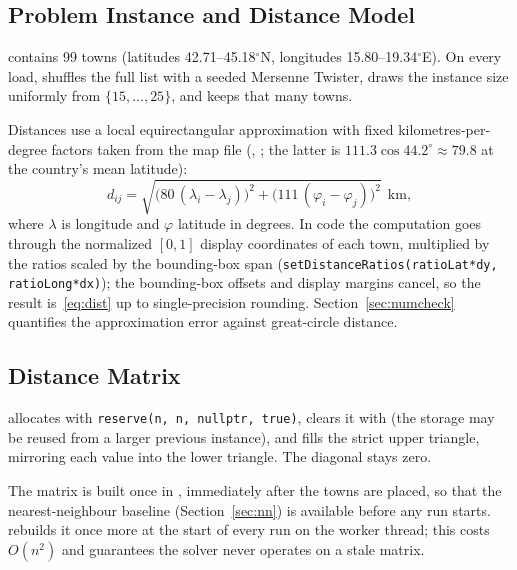 \documentclass[11pt,a4paper]{article}
\begin{document}
\subsection{Problem Instance and Distance Model}
 contains 99 towns (latitudes 42.71--45.18$^\circ$N, longitudes
15.80--19.34$^\circ$E). On every load,  shuffles the full list with a seeded
Mersenne Twister, draws the instance size uniformly from $\{15,\dots,25\}$, and keeps that many towns.

Distances use a local equirectangular approximation with fixed kilometres-per-degree factors taken from
the map file (, ; the latter is $111.3\cos 44.2^\circ\approx 79.8$
at the country's mean latitude):
\begin{equation}
d_{ij}=\sqrt{\bigl(80\,(\lambda_i-\lambda_j)\bigr)^2+\bigl(111\,(\varphi_i-\varphi_j)\bigr)^2}\ \ \text{km},
\label{eq:dist}
\end{equation}
where $\lambda$ is longitude and $\varphi$ latitude in degrees. In code the computation goes through the
normalized $[0,1]$ display coordinates of each town, multiplied by the ratios scaled by the bounding-box
span (\texttt{setDistanceRatios(ratioLat*dy, ratioLong*dx)}); the bounding-box offsets and display margins
cancel, so the result is~\eqref{eq:dist} up to single-precision rounding. Section~\ref{sec:numcheck} quantifies the approximation
error against great-circle distance.

\subsection{Distance Matrix}
 allocates  with \texttt{reserve(n, n, nullptr, true)},
clears it with  (the storage may be reused from a larger previous instance), and fills the
strict upper triangle, mirroring each value into the lower triangle. The diagonal stays zero.

The matrix is built once in , immediately after the towns are placed, so that the
nearest-neighbour baseline (Section~\ref{sec:nn}) is available before any run starts. 
rebuilds it once more at the start of every run on the worker thread; this costs $O(n^2)$ and guarantees
the solver never operates on a stale matrix.
\end{document}
